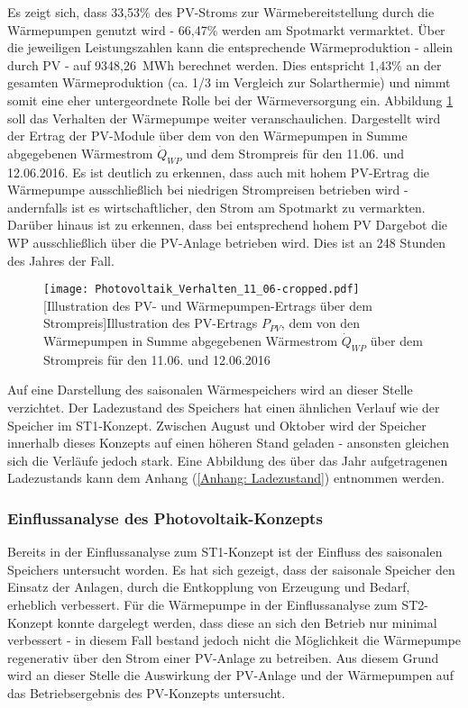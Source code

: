 Es zeigt sich, dass 33,53\% des \ac{PV}-Stroms zur Wärmebereitstellung durch die Wärmepumpen genutzt wird - 66,47\% werden am Spotmarkt vermarktet. Über die jeweiligen Leistungszahlen kann die entsprechende Wärmeproduktion - allein durch \ac{PV} - auf 9348,26~MWh berechnet werden. Dies entspricht 1,43\% an der gesamten Wärmeproduktion (ca. 1/3 im Vergleich zur Solarthermie) und nimmt somit eine eher untergeordnete Rolle bei der Wärmeversorgung ein. Abbildung \ref{figure: Verhalten_PV} soll das Verhalten der Wärmepumpe weiter veranschaulichen. Dargestellt wird der Ertrag der \ac{PV}-Module über dem von den Wärmepumpen in Summe abgegebenen Wärmestrom $\dot{Q}_{\textit{WP}}$ und dem Strompreis für den 11.06. und 12.06.2016. Es ist deutlich zu erkennen, dass auch mit hohem \ac{PV}-Ertrag die Wärmepumpe ausschließlich bei niedrigen Strompreisen betrieben wird - andernfalls ist es wirtschaftlicher, den Strom am Spotmarkt zu vermarkten. Darüber hinaus ist zu erkennen, dass bei entsprechend hohem \ac{PV} Dargebot die \ac{WP} ausschließlich über die \ac{PV}-Anlage betrieben wird. Dies ist an 248 Stunden des Jahres der Fall.
	\begin{figure}[ht]
		\centering
		\texttt{[image: Photovoltaik\_Verhalten\_11\_06-cropped.pdf]}
		[Illustration des PV- und Wärmepumpen-Ertrags über dem Strompreis]{Illustration des PV-Ertrags $P_{PV}$, dem von den Wärmepumpen in Summe abgegebenen Wärmestrom $\dot{Q}_{WP}$ über dem Strompreis für den 11.06. und 12.06.2016}
		\label{figure: Verhalten_PV}
	\end{figure}

Auf eine Darstellung des saisonalen Wärmespeichers wird an dieser Stelle verzichtet. Der Ladezustand des Speichers hat einen ähnlichen Verlauf wie der Speicher im ST1-Konzept. Zwischen August und Oktober wird der Speicher innerhalb dieses Konzepts auf einen höheren Stand geladen - ansonsten gleichen sich die Verläufe jedoch stark. Eine Abbildung des über das Jahr aufgetragenen Ladezustands kann dem Anhang (\ref{Anhang: Ladezustand}) entnommen werden.

\subsubsection*{Einflussanalyse des Photovoltaik-Konzepts}
Bereits in der Einflussanalyse zum ST1-Konzept ist der Einfluss des saisonalen Speichers untersucht worden. Es hat sich gezeigt, dass der saisonale Speicher den Einsatz der Anlagen, durch die Entkopplung von Erzeugung und Bedarf, erheblich verbessert. Für die Wärmepumpe in der Einflussanalyse zum ST2-Konzept konnte dargelegt werden, dass diese an sich den Betrieb nur minimal verbessert - in diesem Fall bestand jedoch nicht die Möglichkeit die Wärmepumpe regenerativ über den Strom einer \ac{PV}-Anlage zu betreiben. Aus diesem Grund wird an dieser Stelle die Auswirkung der \ac{PV}-Anlage und der Wärmepumpen auf das Betriebsergebnis des \ac{PV}-Konzepts untersucht.

